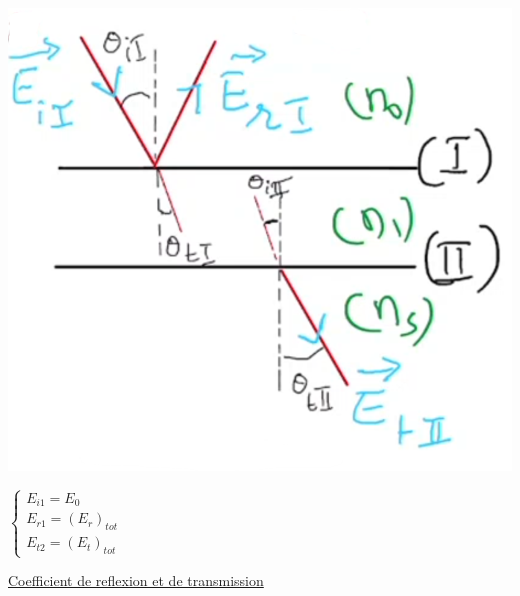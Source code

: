 \documentclass[12pt]{book}
\begin{document}
\begin{center}
\begin{minipage}{0.64\linewidth}
                \end{minipage}
                \begin{minipage}{0.35\linewidth}
                    \includegraphics[width=\linewidth]{pic/lameinair2.png}\\
                    \begin{center}
                        $\begin{cases}
                            E_{i1} = E_0 \\
                            E_{r1}=(E_r)_{tot} \\
                            E_{t2}=(E_t)_{tot}
                        \end{cases}$
                    \end{center}
                \end{minipage} 
            \end{center}
            \pagebreak
            \underline{Coefficient de reflexion et de transmission} \\
\end{document}
